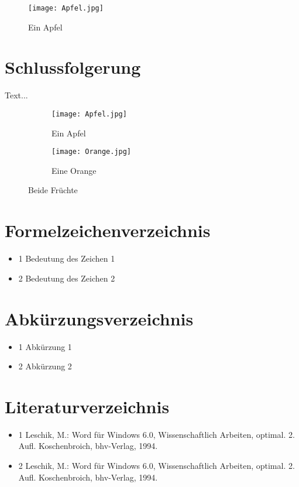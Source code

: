 \documentclass[11pt]{report}
\begin{document}
\begin{figure}[h]
\texttt{[image: Apfel.jpg]}
\centering
\caption{Ein Apfel}
\end{figure}

\chapter{Schlussfolgerung}
Text...

\begin{figure}[h]
\centering
\begin{subfigure}{0.49\textwidth}
\centering
\texttt{[image: Apfel.jpg]}
\caption{Ein Apfel}
\label{fig:left}
\end{subfigure}
\begin{subfigure}{0.49\textwidth}
\centering
\texttt{[image: Orange.jpg]}
\caption{Eine Orange}
\label{fig:right}
\end{subfigure}
\caption{Beide Früchte}
\end{figure}

\chapter{Formelzeichenverzeichnis}
\begin{itemize}
	\item 1 Bedeutung des Zeichen 1
	\item 2 Bedeutung des Zeichen 2
\end{itemize}

\chapter{Abkürzungsverzeichnis}
\begin{itemize}
	\item 1 Abkürzung 1
	\item 2 Abkürzung 2
\end{itemize}

\chapter{Literaturverzeichnis}
\begin{itemize}
	\item 1 Leschik, M.: Word für Windows 6.0, Wissenschaftlich Arbeiten, optimal. 2. Aufl. Koschenbroich, bhv-Verlag, 1994.
	\item 2 Leschik, M.: Word für Windows 6.0, Wissenschaftlich Arbeiten, optimal. 2. Aufl. Koschenbroich, bhv-Verlag, 1994.
\end{itemize}
\end{document}
